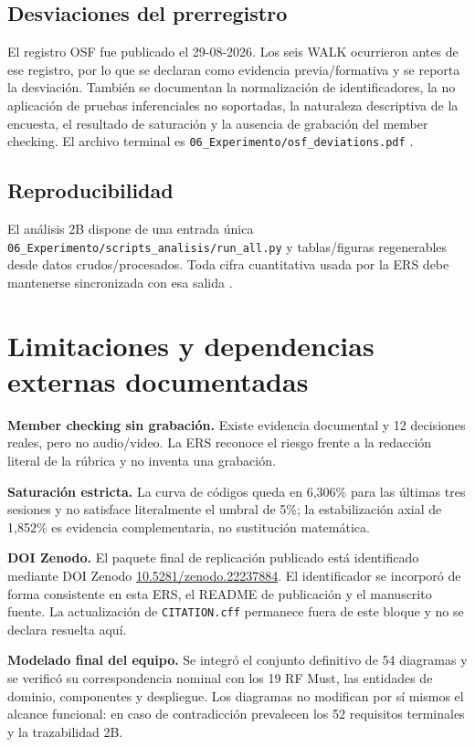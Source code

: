 \documentclass[11pt,a4paper,twoside]{article}
\begin{document}
\subsection{Desviaciones del prerregistro}
El registro OSF fue publicado el 29-08-2026. Los seis WALK ocurrieron antes de ese registro, por lo que se declaran como evidencia previa/formativa y se reporta la desviación. También se documentan la normalización de identificadores, la no aplicación de pruebas inferenciales no soportadas, la naturaleza descriptiva de la encuesta, el resultado de saturación y la ausencia de grabación del member checking. El archivo terminal es \texttt{06\_Experimento/osf\_deviations.pdf} \cite{nosek2018}.

\subsection{Reproducibilidad}
El análisis 2B dispone de una entrada única \texttt{06\_Experimento/scripts\_analisis/run\_all.py} y tablas/figuras regenerables desde datos crudos/procesados. Toda cifra cuantitativa usada por la ERS debe mantenerse sincronizada con esa salida \cite{sandve2013,wilkinson2016}.

\section{Limitaciones y dependencias externas documentadas}
\begin{riskbox}
\textbf{Member checking sin grabación.} Existe evidencia documental y 12 decisiones reales, pero no audio/video. La ERS reconoce el riesgo frente a la redacción literal de la rúbrica y no inventa una grabación.
\end{riskbox}
\begin{riskbox}
\textbf{Saturación estricta.} La curva de códigos queda en 6,306\% para las últimas tres sesiones y no satisface literalmente el umbral de 5\%; la estabilización axial de 1,852\% es evidencia complementaria, no sustitución matemática.
\end{riskbox}
\begin{riskbox}
\textbf{DOI Zenodo.} El paquete final de replicación publicado está identificado mediante DOI Zenodo \href{https://doi.org/10.5281/zenodo.22237884}{10.5281/zenodo.22237884}. El identificador se incorporó de forma consistente en esta ERS, el README de publicación y el manuscrito fuente. La actualización de \texttt{CITATION.cff} permanece fuera de este bloque y no se declara resuelta aquí.
\end{riskbox}
\begin{riskbox}
\textbf{Modelado final del equipo.} Se integró el conjunto definitivo de 54 diagramas y se verificó su correspondencia nominal con los 19 RF Must, las entidades de dominio, componentes y despliegue. Los diagramas no modifican por sí mismos el alcance funcional: en caso de contradicción prevalecen los 52 requisitos terminales y la trazabilidad 2B.
\end{riskbox}
\end{document}
